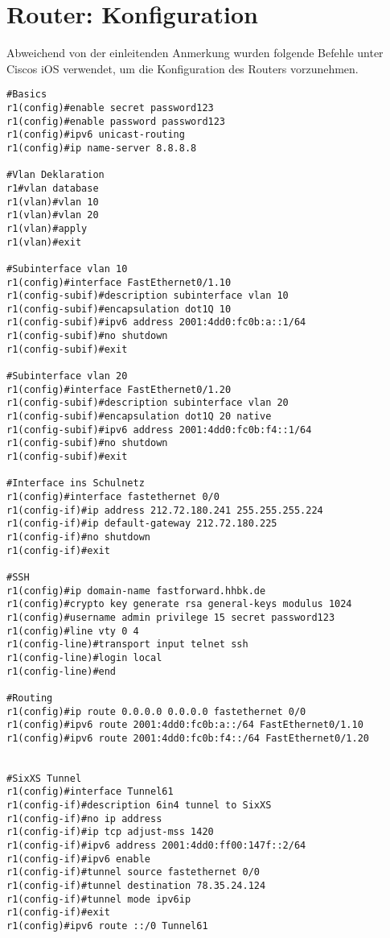 \section{Router: Konfiguration}

Abweichend von der einleitenden Anmerkung wurden folgende Befehle unter Ciscos iOS verwendet, um die Konfiguration des Routers vorzunehmen.

\begin{lstlisting}[numbers=none]
#Basics
r1(config)#enable secret password123
r1(config)#enable password password123
r1(config)#ipv6 unicast-routing
r1(config)#ip name-server 8.8.8.8

#Vlan Deklaration
r1#vlan database 
r1(vlan)#vlan 10
r1(vlan)#vlan 20
r1(vlan)#apply
r1(vlan)#exit

#Subinterface vlan 10
r1(config)#interface FastEthernet0/1.10
r1(config-subif)#description subinterface vlan 10
r1(config-subif)#encapsulation dot1Q 10
r1(config-subif)#ipv6 address 2001:4dd0:fc0b:a::1/64
r1(config-subif)#no shutdown
r1(config-subif)#exit

#Subinterface vlan 20
r1(config)#interface FastEthernet0/1.20
r1(config-subif)#description subinterface vlan 20
r1(config-subif)#encapsulation dot1Q 20 native
r1(config-subif)#ipv6 address 2001:4dd0:fc0b:f4::1/64
r1(config-subif)#no shutdown
r1(config-subif)#exit

#Interface ins Schulnetz
r1(config)#interface fastethernet 0/0
r1(config-if)#ip address 212.72.180.241 255.255.255.224
r1(config-if)#ip default-gateway 212.72.180.225
r1(config-if)#no shutdown
r1(config-if)#exit

#SSH
r1(config)#ip domain-name fastforward.hhbk.de
r1(config)#crypto key generate rsa general-keys modulus 1024
r1(config)#username admin privilege 15 secret password123
r1(config)#line vty 0 4
r1(config-line)#transport input telnet ssh
r1(config-line)#login local
r1(config-line)#end

#Routing
r1(config)#ip route 0.0.0.0 0.0.0.0 fastethernet 0/0
r1(config)#ipv6 route 2001:4dd0:fc0b:a::/64 FastEthernet0/1.10
r1(config)#ipv6 route 2001:4dd0:fc0b:f4::/64 FastEthernet0/1.20


#SixXS Tunnel
r1(config)#interface Tunnel61
r1(config-if)#description 6in4 tunnel to SixXS
r1(config-if)#no ip address
r1(config-if)#ip tcp adjust-mss 1420
r1(config-if)#ipv6 address 2001:4dd0:ff00:147f::2/64
r1(config-if)#ipv6 enable
r1(config-if)#tunnel source fastethernet 0/0
r1(config-if)#tunnel destination 78.35.24.124
r1(config-if)#tunnel mode ipv6ip
r1(config-if)#exit
r1(config)#ipv6 route ::/0 Tunnel61



\end{lstlisting}
